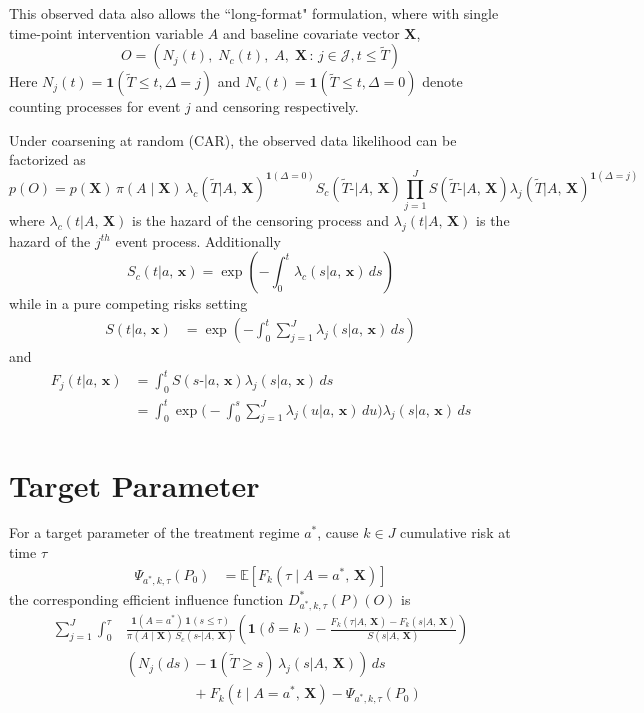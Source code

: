 \documentclass{article}
\newcommand{\J}{\ensuremath{J}}
\newcommand{\1}{\ensuremath{\mathbf{1}}}
\newcommand{\T}{\ensuremath{\widetilde{T}}}
\newcommand{\X}{\ensuremath{\mathbf{X}}}
\renewcommand{\t}{\ensuremath{\Tilde{t}}}
\newcommand{\ax}{\ensuremath{\mid a,\,\mathbf{x}}}
\newcommand{\AX}{\ensuremath{\mid A,\,\mathbf{X}}}
\newcommand{\x}{\ensuremath{\mathbf{x}}}
\newcommand{\trt}{\ensuremath{a^*}}
\newcommand{\tk}{\ensuremath{\tau}}
\newcommand{\jj}{\ensuremath{k}}
\newcommand{\g}{\ensuremath{\pi}}
\begin{document}
This observed data also allows the ``long-format" formulation, where with single time-point intervention variable $A$ and baseline covariate vector $\X$,
\[O = (N_j(t),\;N_c(t),\;A,\;\X\,:\, j\in\mathcal{J}, t \leq \T)\] 
Here $N_j(t) = \1(\T \leq t, \Delta = j)$ and $N_c(t) = \1(\T \leq t, \Delta = 0)$ denote counting processes for event $j$ and censoring respectively.

Under coarsening at random (CAR), the observed data likelihood can be factorized as 
\[p(O) = p(\X)\, \g(A \mid \X)\, \lambda_c(\T \AX)^{\1(\Delta = 0)} S_c(\T\text{-} \AX) \prod_{j=1}^{J} S(\T\text{-} \AX) \lambda_j(\T \AX)^{\1(\Delta = j)} \]
where $\lambda_c(t \AX)$ is the hazard of the censoring process and $\lambda_j(t \AX)$ is the hazard of the $j^{th}$ event process. Additionally 
\[S_c(t \ax) = \exp\left(-\int_{0}^{t} \lambda_c(s \ax) \,ds\right)\]  
while in a pure competing risks setting 
\begin{align*}
    S(t \ax) &= \exp\left(-\int_{0}^{t} \sum_{j=1}^{J} \lambda_j(s \ax) \,ds\right)
\end{align*}
and 
\begin{align*}
    F_j(t \ax) &= \int_{0}^{t} S(s\text{-} \ax) \lambda_j(s \ax)\,ds\\
    &= \int_{0}^{t} \exp\bigg(-\int_{0}^{s} \sum_{j=1}^{J} \lambda_j(u \ax)\,du\bigg) \lambda_j(s \ax)\,ds
\end{align*}

\section{Target Parameter}
For a target parameter of the treatment regime $\trt$, cause $\jj \in \J$ cumulative risk at time $\tk$
\begin{align*}
    \Psi_{\trt, \jj, \tk}(P_0) &= \mathbb{E}\left[F_\jj(\tk \mid A = \trt,\,\X)\right]
\end{align*}
the corresponding efficient influence function $D^{*}_{\trt, \jj, \tk}(P)(O) $ is
\begin{align*}
    \sum_{j = 1}^{J} \int_{0}^{\tk} &\frac{\1(A = \trt)\, \1(s \leq \tk)}{\g(A \mid \X)\,S_c(s\text{-} \AX)} \left(\1(\delta = \jj) - \frac{F_\jj(\tk \AX) - F_\jj(s \AX)}{S(s \AX)}\right) \\ &\left(N_j(ds) - \1(\T \geq s)\,\lambda_j(s \AX)\right) \,ds\\[2mm]
    &\hspace{2cm}+ F_\jj(t \mid A = \trt,\,\X) - \Psi_{\trt, \jj, \tk}(P_0)
\end{align*}
\end{document}

